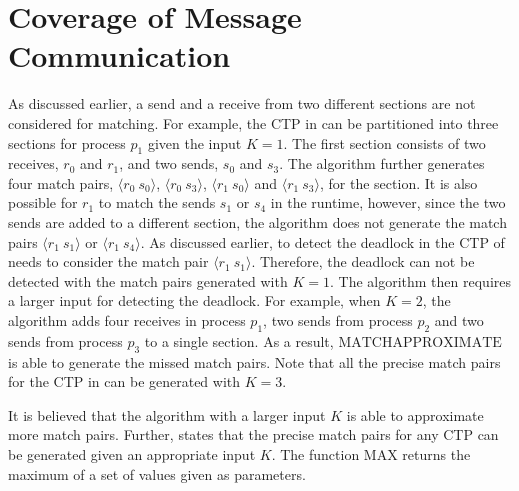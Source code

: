 \section{Coverage of Message Communication}


As discussed earlier, a send and a receive from two different sections are not considered for matching. For example, the CTP in  can be partitioned into three sections for process $p_1$ given the input $K=1$. The first section consists of two receives, $r_0$ and $r_1$, and two sends, $s_0$ and $s_3$. The algorithm further generates four match pairs, $\langle r_0\ s_0\rangle$, $\langle r_0\ s_3\rangle$, $\langle r_1\ s_0\rangle$ and $\langle r_1\ s_3\rangle$, for the section. 
It is also possible for $r_1$ to match the sends $s_1$ or $s_4$ in the runtime, however, since the two sends are added to a different section, the algorithm does not generate the match pairs $\langle r_1\ s_1\rangle$ or $\langle r_1\ s_4\rangle$. As discussed earlier, to detect the deadlock in the CTP of  needs to consider the match pair $\langle r_1\ s_1\rangle$. Therefore, the deadlock can not be detected with the match pairs generated with $K=1$.
The algorithm then requires a larger input for detecting the deadlock. For example, when $K=2$, the algorithm adds four receives in process $p_1$, two sends from process $p_2$ and two sends from process $p_3$ to a single section. As a result, $\mathrm{MATCHAPPROXIMATE}$ is able to generate the missed match pairs. Note that all the precise match pairs for the CTP in  can be generated with $K=3$.

It is believed that the algorithm with a larger input $K$ is able to approximate more match pairs. Further,  states that the precise match pairs for any CTP can be generated given an appropriate input $K$.
The function $\mathrm{MAX}$ returns the maximum of a set of values given as parameters.
 

